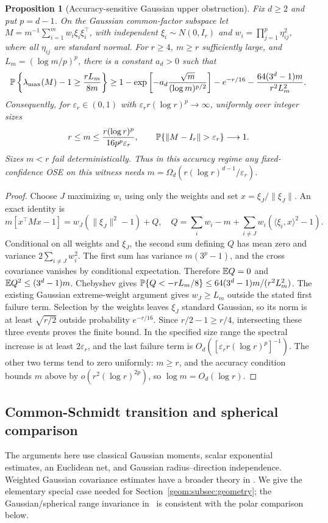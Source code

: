 \documentclass[11pt,a4paper]{article}
\newtheorem{proposition}[theorem]{Proposition}
\theoremstyle{definition}\newtheorem{definition}[theorem]{Definition}
\theoremstyle{remark}\newtheorem{remark}[theorem]{Remark}
\numberwithin{equation}{section}
\newcommand{\norm}[1]{\lVert#1\rVert}\newcommand{\ip}[2]{\langle#1,#2\rangle}
\begin{document}
\begin{proposition}[Accuracy-sensitive Gaussian upper obstruction]\label{lower:prop:accuracy}
Fix $d\ge2$ and put $p=d-1$. On the Gaussian common-factor subspace
let $M=m^{-1}\sum_{i=1}^m w_i\xi_i\xi_i^\top$, with independent
$\xi_i\sim N(0,I_r)$ and $w_i=\prod_{j=1}^p\eta_{ij}^2$, where all
$\eta_{ij}$ are standard normal. For $r\ge4$, $m\ge r$ sufficiently
large, and $L_m=(\log m/p)^p$, there is a constant $a_d>0$ such that
\[
 \mathbb P\left\{\lambda_{\max}(M)-1\ge\frac{rL_m}{8m}\right\}
 \ge1-\exp\left[-a_d\frac{\sqrt m}{(\log m)^{p/2}}\right]
       -e^{-r/16}-\frac{64(3^d-1)m}{r^2L_m^2}.
\]
Consequently, for $\varepsilon_r\in(0,1)$ with
$\varepsilon_r r(\log r)^p\to\infty$, uniformly over integer sizes
\[
 r\le m\le\frac{r(\log r)^p}{16p^p\varepsilon_r},
 \qquad
 \Pp\{\norm{M-I_r}>\varepsilon_r\}\longrightarrow1.
\]
Sizes $m<r$ fail deterministically. Thus in this accuracy regime any
fixed-confidence OSE on this witness needs
$m=\Omega_d(r(\log r)^{d-1}/\varepsilon_r)$.
\end{proposition}
\begin{proof}
Choose $J$ maximizing $w_i$ using only the weights and set
$x=\xi_J/\norm{\xi_J}$. An exact identity is
\[
 m[x^\top Mx-1]=w_J(\norm{\xi_J}^2-1)+Q,
 \quad
 Q=\sum_iw_i-m+
   \sum_{i\ne J}w_i(\ip{\xi_i}{x}^2-1).
\]
Conditional on all weights and $\xi_J$, the second sum defining $Q$
has mean zero and variance $2\sum_{i\ne J}w_i^2$. The first sum has
variance $m(3^p-1)$, and the cross covariance vanishes by conditional
expectation. Therefore $\mathbb E Q=0$ and $\mathbb E Q^2\le(3^d-1)m$.
Chebyshev gives
$\mathbb P\{Q<-rL_m/8\}\le64(3^d-1)m/(r^2L_m^2)$.
The existing Gaussian extreme-weight argument gives $w_J\ge L_m$
outside the stated first failure term. Selection by the weights leaves
$\xi_J$ standard Gaussian, so its norm is at least $\sqrt{r/2}$ outside
probability $e^{-r/16}$. Since $r/2-1\ge r/4$, intersecting these three
events proves the finite bound. In the specified size range the spectral
increase is at least $2\varepsilon_r$, and the last failure term is
$O_d([\varepsilon_r r(\log r)^p]^{-1})$. The other two terms tend to
zero uniformly: $m\ge r$, and the accuracy condition bounds $m$ above
by $o(r^2(\log r)^{2p})$, so $\log m=O_d(\log r)$.
\end{proof}

\subsection{Common-Schmidt transition and spherical comparison}
\label{geom:appendix}
The arguments here use classical Gaussian moments, scalar exponential
estimates, an Euclidean net, and Gaussian radius--direction independence.
Weighted Gaussian covariance estimates have a broader theory in
\cite{CHZ2022}. We give the elementary special case needed for
Section~\ref{geom:subsec:geometry}; the Gaussian/spherical range
invariance in~\cite[Section~5.4]{CEMT2025} is consistent with the polar
comparison below.
\end{document}
